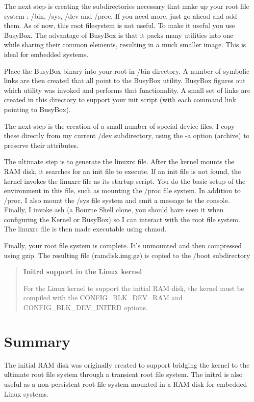 \documentclass[a4paper,11pt]{report}
\begin{document}
The next step is creating the subdirectories necessary that make up your
root file system : /bin, /sys, /dev and /proc. If you need more, just go
ahead and add them. 
As of now, this root filesystem is not useful. To make it useful you use
BusyBox. The advantage of BusyBox is that it packs many utilities into one while sharing their common elements, resulting in a much smaller image. This is ideal for embedded systems.

Place the BusyBox binary into your root in /bin directory. A number of symbolic links are then created that all point to the BusyBox utility. BusyBox figures out which utility was invoked and performs that functionality. A small set of links are created in this directory to support your init script (with each command link pointing to BusyBox).

The next step is the creation of a small number of special device files. I copy these directly from my current /dev subdirectory, using the -a option (archive) to preserve their attributes.

The ultimate step is to generate the linuxrc file. After the kernel mounts the RAM disk, it searches for an init file to execute. If an init file is not found, the kernel invokes the linuxrc file as its startup script. You do the basic setup of the environment in this file, such as mounting the /proc file system. In addition to /proc, I also mount the /sys file system and emit a message to the console. Finally, I invoke ash (a Bourne Shell clone, you should have seen it when configuring the Kernel or BusyBox) so I can interact with the root file system. The linuxrc file is then made executable using chmod.

Finally, your root file system is complete. It's unmounted and then compressed using gzip. The resulting file (ramdisk.img.gz) is copied to the /boot subdirectory
\begin{verse}
  \textbf{Initrd support in the Linux kernel}

For the Linux kernel to support the initial RAM disk, the kernel must be compiled with the CONFIG_BLK_DEV_RAM and CONFIG_BLK_DEV_INITRD options.
\end{verse}



\section{Summary}

The initial RAM disk was originally created to support bridging the kernel to the ultimate root file system through a transient root file system. The initrd is also useful as a non-persistent root file system mounted in a RAM disk for embedded Linux systems.
\end{document}
